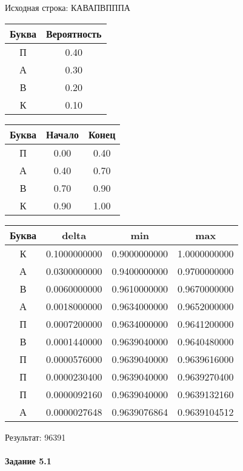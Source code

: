 \documentclass[a4paper, 12pt]{article}
\begin{document}
Исходная строка: КАВАПВПППА\
\begin{center}
 \begin{tabular}{ |c|c| } 
  \hline
     Буква & Вероятность \\ \hline
П & 0.40\\\hline
А & 0.30\\\hline
В & 0.20\\\hline
К & 0.10
\\ \hline \end{tabular}
\end{center}
\begin{center}
 \begin{tabular}{ |c|c|c| } 
  \hline
     Буква & Начало & Конец \\ \hline
П & 0.00 & 0.40\\\hline
А & 0.40 & 0.70\\\hline
В & 0.70 & 0.90\\\hline
К & 0.90 & 1.00
\\ \hline \end{tabular}
\end{center}
\begin{center}
 \begin{tabular}{ |c|c|c|c| } 
  \hline
     Буква & delta & min & max \\ \hline
К & 0.1000000000 & 0.9000000000 & 1.0000000000\\\hline
А & 0.0300000000 & 0.9400000000 & 0.9700000000\\\hline
В & 0.0060000000 & 0.9610000000 & 0.9670000000\\\hline
А & 0.0018000000 & 0.9634000000 & 0.9652000000\\\hline
П & 0.0007200000 & 0.9634000000 & 0.9641200000\\\hline
В & 0.0001440000 & 0.9639040000 & 0.9640480000\\\hline
П & 0.0000576000 & 0.9639040000 & 0.9639616000\\\hline
П & 0.0000230400 & 0.9639040000 & 0.9639270400\\\hline
П & 0.0000092160 & 0.9639040000 & 0.9639132160\\\hline
А & 0.0000027648 & 0.9639076864 & 0.9639104512
\\ \hline \end{tabular}
\end{center}
Результат: 96391
\pagebreak
\paragraph{Задание 5.1}
\end{document}
